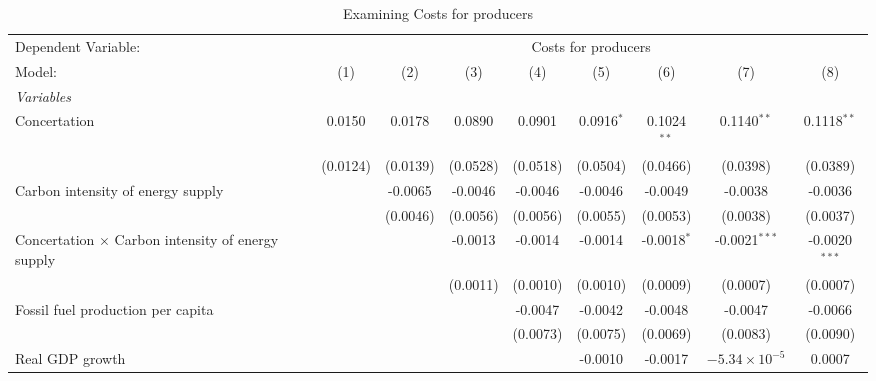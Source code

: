 
\begin{table}[htbp]
   \caption{Examining Costs for producers}
   \centering
   \begin{tabular}{lcccccccc}
      \tabularnewline \midrule \midrule
      Dependent Variable: & \multicolumn{8}{c}{Costs for producers}\\
      Model:                                                   & (1)      & (2)      & (3)      & (4)      & (5)          & (6)           & (7)                    & (8)\\  
      \midrule
      \emph{Variables}\\
      Concertation                                             & 0.0150   & 0.0178   & 0.0890   & 0.0901   & 0.0916$^{*}$ & 0.1024$^{**}$ & 0.1140$^{**}$          & 0.1118$^{**}$\\   
                                                               & (0.0124) & (0.0139) & (0.0528) & (0.0518) & (0.0504)     & (0.0466)      & (0.0398)               & (0.0389)\\   
      Carbon intensity of energy supply                        &          & -0.0065  & -0.0046  & -0.0046  & -0.0046      & -0.0049       & -0.0038                & -0.0036\\   
                                                               &          & (0.0046) & (0.0056) & (0.0056) & (0.0055)     & (0.0053)      & (0.0038)               & (0.0037)\\   
      Concertation $\times$ Carbon intensity of energy supply  &          &          & -0.0013  & -0.0014  & -0.0014      & -0.0018$^{*}$ & -0.0021$^{***}$        & -0.0020$^{***}$\\   
                                                               &          &          & (0.0011) & (0.0010) & (0.0010)     & (0.0009)      & (0.0007)               & (0.0007)\\   
      Fossil fuel production per capita                        &          &          &          & -0.0047  & -0.0042      & -0.0048       & -0.0047                & -0.0066\\   
                                                               &          &          &          & (0.0073) & (0.0075)     & (0.0069)      & (0.0083)               & (0.0090)\\   
      Real GDP growth                                          &          &          &          &          & -0.0010      & -0.0017       & $-5.34\times 10^{-5}$  & 0.0007\\   

\end{tabular}
\end{table}
